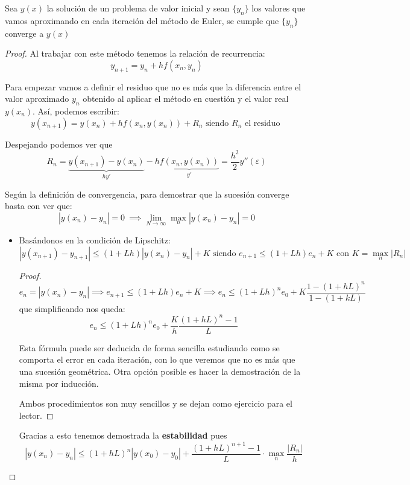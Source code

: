 \documentclass{apuntes}
\begin{document}
\begin{theorem}

Sea $y(x)$ la solución de un problema de valor inicial y sean $\{y_n\}$ los valores que vamos aproximando en cada iteración del método de Euler, se cumple que $\{y_n\}$ converge a $y(x)$
\end{theorem}
\begin{proof}
Al trabajar con este método tenemos la relación de recurrencia:
\[y_{n+1} = y_n + h f(x_n, y_n)\]

Para empezar vamos a definir el residuo que no es más que la diferencia entre el valor aproximado $y_n$ obtenido al aplicar el método en cuestión y el valor real $y(x_n)$. Así, podemos escribir:
\[y(x_{n+1})=y(x_n)+hf(x_n,y(x_n))+R_n \text{ siendo } R_n \text{ el residuo }\]

Despejando podemos ver que
\[R_n = \underbrace{y(x_{n+1})-y(x_n)}_{hy'}-h\underbrace{f(x_n,y(x_n))}_{y'} = \frac{h^2}{2}y''(ε)\]


Según la definición de convergencia, para demostrar que la sucesión converge basta con ver que:
\[|y(x_n)-y_n | = 0 \ \implies \lim_{N \to \infty} \max_n |y(x_n)-y_n| = 0\]


\begin{itemize}
\item Basándonos en la condición de Lipschitz:
\[|y(x_{n+1})-y_{n+1}| \leq (1+Lh)|y(x_n)-y_n|+K \text{ siendo } e_{n+1} \leq (1+Lh)e_n + K \text{ con } K = \max_n |R_n|\]

\begin{proof}
\[e_n = |y(x_n)-y_n| \implies e_{n+1} \leq (1+Lh)e_n+K \implies e_n \leq (1+Lh)^n e_0 + K \frac{1-(1+hL)^n}{1-(1+kL)}\]
que simplificando nos queda:
\[e_n \leq (1+Lh)^n e_0 + \frac{K}{h}\frac{(1+hL)^n-1}{L}\]

Esta fórmula puede ser deducida de forma sencilla estudiando como se comporta el error en cada iteración, con lo que veremos que no es más que una sucesión geométrica. Otra opción posible es hacer la demostración de la misma por inducción.

Ambos procedimientos son muy sencillos y se dejan como ejercicio para el lector.
\end{proof}

Gracias a esto tenemos demostrada la \textbf{estabilidad} pues
\[|y(x_n)-y_n| \leq (1+hL)^n |y(x_0)-y_0| + \frac{(1+hL)^{n+1}-1}{L}\cdot \max_n \frac{|R_n|}{h}\]
%



\end{itemize}
\end{proof}
\end{document}
